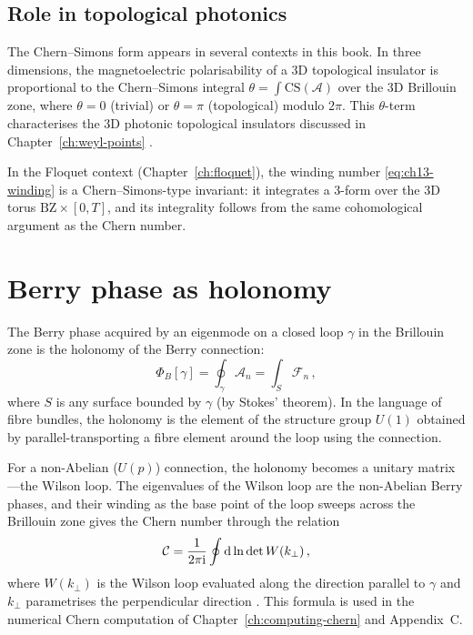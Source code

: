 \subsection{Role in topological photonics}
\label{sec:appB-cs-role}

The Chern--Simons form appears in several contexts in this book.
In three dimensions, the magnetoelectric polarisability of a 3D
topological insulator is proportional to the Chern--Simons integral
$\theta=\int\mathrm{CS}(\mathcal{A})$ over the 3D Brillouin zone,
where $\theta=0$ (trivial) or $\theta=\pi$ (topological) modulo
$2\pi$.  This $\theta$-term characterises the 3D photonic topological
insulators discussed in Chapter~\ref{ch:weyl-points}
\cite{ozawa2018topological}.

In the Floquet context (Chapter~\ref{ch:floquet}), the winding number
\eqref{eq:ch13-winding} is a Chern--Simons-type invariant: it
integrates a 3-form over the 3D torus
$\mathrm{BZ}\times[0,T]$, and its integrality follows from the same
cohomological argument as the Chern number.

\section{Berry phase as holonomy} \cite{chen2023berry}
\label{sec:appB-holonomy}

The Berry phase acquired by an eigenmode on a closed loop
$\gamma$ in the Brillouin zone is the holonomy of the Berry
connection:
\begin{equation}\label{eq:appB-holonomy}
  \Phi_B[\gamma]
  = \oint_\gamma\mathcal{A}_n
  = \int_S\mathcal{F}_n\,,
\end{equation}
where $S$ is any surface bounded by $\gamma$ (by Stokes' theorem).
In the language of fibre bundles, the holonomy is the element of the
structure group $U(1)$ obtained by parallel-transporting a fibre
element around the loop using the connection.

For a non-Abelian ($U(p)$) connection, the holonomy becomes a
unitary matrix---the Wilson loop.  The eigenvalues of the Wilson
loop are the non-Abelian Berry phases, and their winding as the
base point of the loop sweeps across the Brillouin zone gives
the Chern number through the relation
\begin{equation}\label{eq:appB-wilson-chern}
  \mathcal{C} = \frac{1}{2\pi\mathrm{i}}\oint\mathrm{d}\ln\det W(k_\perp)\,,
\end{equation}
where $W(k_\perp)$ is the Wilson loop evaluated along the direction
parallel to $\gamma$ and $k_\perp$ parametrises the perpendicular
direction \cite{gangaraj2016berry,ozawa2018topological}.
This formula is used in the numerical Chern computation of
Chapter~\ref{ch:computing-chern} and Appendix~C.

